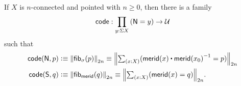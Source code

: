\documentclass[hott-all.tex]{subfiles}
\begin{document}
% 
\begin{defn}
  If $X$ is $n$-connected and pointed with $n\geq 0$, then there is a family
  \begin{equation}
    \code:\prd{y:\susp X} (\north=y) \to \type\fakelabel{eq:freudcode}
  \end{equation}
  such that
  \begin{align}
    \code(\north,p) &\defeq \trunc{2n}{\hfib{\sigma}{p}}
    \jdeq \trunc{2n}{\tsm{x:X} (\merid(x) \ct \opp{\merid(x_0)} = p)}\fakelabel{eq:freudcodeN}\\
    \code(\south,q) &\defeq \trunc{2n}{\hfib{\merid}{q}}
    \jdeq \trunc{2n}{\tsm{x:X} (\merid(x) = q)}.\fakelabel{eq:freudcodeS}
  \end{align}
\end{defn}
% 
% 
\end{document}
